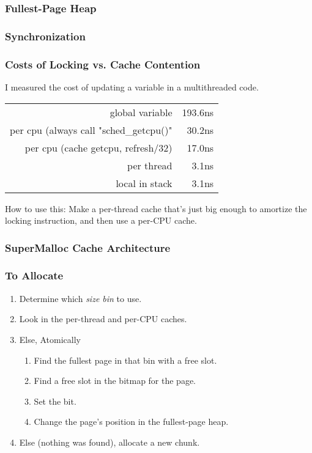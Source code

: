 \documentclass[xcolor=dvipsnames,14pt]{beamer}
\begin{document}
\begin{frame}
\frametitle{Fullest-Page Heap}

\end{frame}

\begin{frame}
\frametitle{Synchronization}
\end{frame}


\begin{frame}[fragile]
\frametitle{Costs of Locking vs. Cache Contention}

I measured the cost of updating a variable in a multithreaded code.

\begin{tabular}{rr}
                                                  global variable &    193.6ns \\
            per cpu (always call "sched_getcpu()"  &     30.2ns \\
per cpu (cache getcpu, refresh/32) &     17.0ns \\
                                                      per thread &      3.1ns \\
                                                  local in stack &      3.1ns \\
\end{tabular}

How to use this:  Make a per-thread cache that's just big enough to amortize the locking instruction, and then use a per-CPU cache.
\end{frame}

\begin{frame}
\frametitle{SuperMalloc Cache Architecture}

\end{frame}

\begin{frame}
\frametitle{To Allocate}


\begin{enumerate}
\item Determine which \textit{size bin} to use.
\item Look in the per-thread and per-CPU caches.
\item Else, Atomically 
  \begin{enumerate}
  \item Find the fullest page in that bin with a free slot.
  \item Find a free slot in the bitmap for the page.
  \item Set the bit.
  \item Change the page's position in the fullest-page heap.
  \end{enumerate}
\item Else (nothing was found), allocate a new chunk.
\end{enumerate}
\end{frame}
\end{document}
